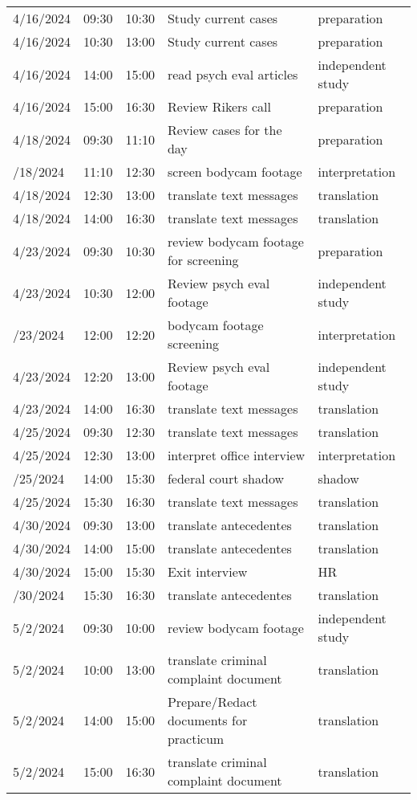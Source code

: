\begin{table}
\begin{tabular}{lllll}
4/16/2024 & 09:30 & 10:30 & Study current cases & preparation\\
4/16/2024 & 10:30 & 13:00 & Study current cases & preparation\\
4/16/2024 & 14:00 & 15:00 & read psych eval articles & independent study\\
4/16/2024 & 15:00 & 16:30 & Review Rikers call & preparation\\
4/18/2024 & 09:30 & 11:10 & Review cases for the day & preparation\\
\addlinespace
4/18/2024 & 11:10 & 12:30 & screen bodycam footage & interpretation\\
4/18/2024 & 12:30 & 13:00 & translate text messages & translation\\
4/18/2024 & 14:00 & 16:30 & translate text messages & translation\\
4/23/2024 & 09:30 & 10:30 & review bodycam footage for screening & preparation\\
4/23/2024 & 10:30 & 12:00 & Review psych eval footage & independent study\\
\addlinespace
4/23/2024 & 12:00 & 12:20 & bodycam footage screening & interpretation\\
4/23/2024 & 12:20 & 13:00 & Review psych eval footage & independent study\\
4/23/2024 & 14:00 & 16:30 & translate text messages & translation\\
4/25/2024 & 09:30 & 12:30 & translate text messages & translation\\
4/25/2024 & 12:30 & 13:00 & interpret office interview & interpretation\\
\addlinespace
4/25/2024 & 14:00 & 15:30 & federal court shadow & shadow\\
4/25/2024 & 15:30 & 16:30 & translate text messages & translation\\
4/30/2024 & 09:30 & 13:00 & translate antecedentes & translation\\
4/30/2024 & 14:00 & 15:00 & translate antecedentes & translation\\
4/30/2024 & 15:00 & 15:30 & Exit interview & HR\\
\addlinespace
4/30/2024 & 15:30 & 16:30 & translate antecedentes & translation\\
5/2/2024 & 09:30 & 10:00 & review bodycam footage & independent study\\
5/2/2024 & 10:00 & 13:00 & translate criminal complaint document & translation\\
5/2/2024 & 14:00 & 15:00 & Prepare/Redact documents for practicum & translation\\
5/2/2024 & 15:00 & 16:30 & translate criminal complaint document & translation\\
\bottomrule
\end{tabular}
\end{table}
